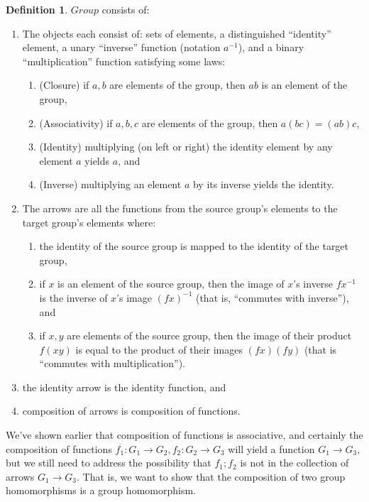 \documentclass{proc-l}
\theoremstyle{definition}
\newtheorem{definition}[theorem]{Definition}
\theoremstyle{remark}
\numberwithin{equation}{section}
\begin{document}
\begin{definition}
\label{groupdefn}
$Group$ consists of:
\begin{enumerate}
    \item The objects each consist of: sets of elements, a distinguished ``identity'' element, a unary ``inverse''  function (notation $a^{-1}$), and a binary ``multiplication'' function satisfying some laws: 
    \begin{enumerate}
        \item (Closure) if $a, b$ are elements of the group, then $a b$ is an element of the group,
        \item (Associativity) if $a, b, c$ are elements of the group, then $a (b c) = (a b) c$,
        \item (Identity) multiplying (on left or right) the identity element by any element $a$ yields $a$, and
        \item (Inverse) multiplying an element $a$ by its inverse  yields the identity. 
    \end{enumerate}
    \item The arrows are all the functions from the source group's elements to the target group's elements where:
    \begin{enumerate}
        \item the identity of the source group is mapped to the identity of the target group,
        \item if $x$ is an element of the source group, then the image of $x$'s inverse $f x^{-1}$ is the inverse of $x$'s image $(f x)^{-1}$ (that is, ``commutes with inverse''), and
        \item if $x, y$ are elements of the source group, then the image of their product $f (x y)$ is equal to the product of their images $(f x) (f y)$ (that is ``commutes with multiplication'').
    \end{enumerate}
    \item the identity arrow is the identity function, and
    \item composition of arrows is composition of functions.
\end{enumerate}
\end{definition}

We've shown earlier that composition of functions is associative, and certainly the composition of functions $f_1 : G_1 \rightarrow G_2, f_2 : G_2 \rightarrow G_3$ will yield a function $G_1 \rightarrow G_3$, but we still need to address the possibility that $f_1 ; f_2$ is not in the collection of arrows $G_1 \rightarrow G_3$. That is, we want to show that the composition of two group homomorphisms is a group homomorphism.
\end{document}
